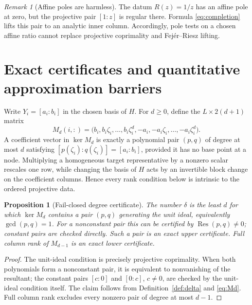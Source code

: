 \documentclass[11pt]{article}
\newtheorem{proposition}[theorem]{Proposition}
\theoremstyle{definition}\newtheorem{definition}[theorem]{Definition}\newtheorem{example}[theorem]{Example}
\theoremstyle{remark}\newtheorem{remark}[theorem]{Remark}\newtheorem{limitation}[theorem]{Limitation}
\newcommand{\Res}{\operatorname{Res}}\newcommand{\mcdeg}{\deg_{\mathrm{McM}}}
\begin{document}
\begin{remark}[Affine poles are harmless]
The datum $R(z)=1/z$ has an affine pole at zero, but the projective pair $[1:z]$
is regular there.  Formula \eqref{eq:completion} lifts this pair to an analytic
inner column.  Accordingly, pole tests on a chosen affine ratio cannot replace
projective coprimality and Fej\'er--Riesz lifting.
\end{remark}

\section{Exact certificates and quantitative approximation barriers}

Write $Y_i=[a_i:b_i]$ in the chosen basis of $H$.  For $d\ge0$, define the
$L\times2(d+1)$ matrix
\begin{equation}\label{eq:Md}
 M_d(i,:)=
 \bigl(b_i,b_i\zeta_i,\ldots,b_i\zeta_i^d,
       -a_i,-a_i\zeta_i,\ldots,-a_i\zeta_i^d\bigr).
\end{equation}
A coefficient vector in $\ker M_d$ is exactly a polynomial pair $(p,q)$ of
degree at most $d$ satisfying $[p(\zeta_i):q(\zeta_i)]=[a_i:b_i]$, provided it
has no base point at a node.
Multiplying a homogeneous target representative by a nonzero scalar rescales
one row, while changing the basis of $H$ acts by an invertible block change on
the coefficient columns.  Hence every rank condition below is intrinsic to the
ordered projective data.

\begin{proposition}[Fail-closed degree certificate]\label{prop:certificate}
The number $\delta$ is the least $d$ for which $\ker M_d$ contains a pair
$(p,q)$ generating the unit ideal, equivalently $\gcd(p,q)=1$.  For a
nonconstant pair this can be certified by $\Res(p,q)\ne0$; constant pairs are
checked directly.  Such a pair is an exact upper certificate.
Full column rank of $M_{d-1}$ is an exact lower certificate.
\end{proposition}

\begin{proof}
The unit-ideal condition is precisely projective coprimality.  When both
polynomials form a nonconstant pair, it is equivalent to nonvanishing of the
resultant; the constant pairs $[c:0]$ and $[0:c]$, $c\ne0$, are checked by the
unit-ideal condition itself.  The claim follows from Definition~\ref{def:delta} and
\eqref{eq:Md}.  Full column rank excludes every nonzero pair of degree at most
$d-1$.
\end{proof}
\end{document}

